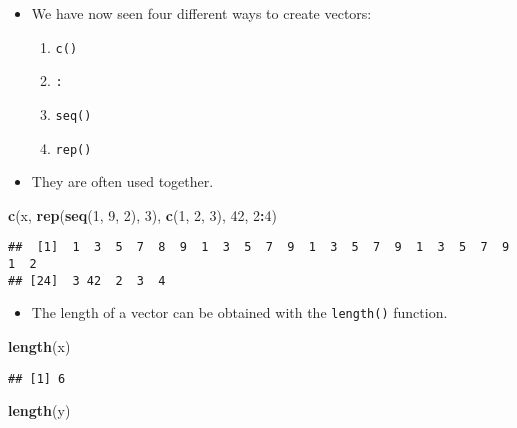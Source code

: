 \documentclass[]{book}
\newenvironment{Shaded}{\begin{snugshade}}{\end{snugshade}}
\newcommand{\DecValTok}[1]{\textcolor[rgb]{0.00,0.00,0.81}{#1}}
\newcommand{\KeywordTok}[1]{\textcolor[rgb]{0.13,0.29,0.53}{\textbf{#1}}}
\newcommand{\NormalTok}[1]{#1}
\newcommand{\OperatorTok}[1]{\textcolor[rgb]{0.81,0.36,0.00}{\textbf{#1}}}
\providecommand{\tightlist}{%
  \setlength{\itemsep}{0pt}\setlength{\parskip}{0pt}}
\begin{document}
\begin{itemize}
\tightlist
\item
  We have now seen four different ways to create vectors:

  \begin{enumerate}
  \def\labelenumi{\arabic{enumi}.}
  \tightlist
  \item
    \texttt{c()}
  \item
    \texttt{:}
  \item
    \texttt{seq()}
  \item
    \texttt{rep()}
  \end{enumerate}
\item
  They are often used together.
\end{itemize}

\begin{Shaded}
\begin{Highlighting}[]
\KeywordTok{c}\NormalTok{(x, }\KeywordTok{rep}\NormalTok{(}\KeywordTok{seq}\NormalTok{(}\DecValTok{1}\NormalTok{, }\DecValTok{9}\NormalTok{, }\DecValTok{2}\NormalTok{), }\DecValTok{3}\NormalTok{), }\KeywordTok{c}\NormalTok{(}\DecValTok{1}\NormalTok{, }\DecValTok{2}\NormalTok{, }\DecValTok{3}\NormalTok{), }\DecValTok{42}\NormalTok{, }\DecValTok{2}\OperatorTok{:}\DecValTok{4}\NormalTok{)}
\end{Highlighting}
\end{Shaded}

\begin{verbatim}
##  [1]  1  3  5  7  8  9  1  3  5  7  9  1  3  5  7  9  1  3  5  7  9  1  2
## [24]  3 42  2  3  4
\end{verbatim}

\begin{itemize}
\tightlist
\item
  The length of a vector can be obtained with the \texttt{length()} function.
\end{itemize}

\begin{Shaded}
\begin{Highlighting}[]
\KeywordTok{length}\NormalTok{(x)}
\end{Highlighting}
\end{Shaded}

\begin{verbatim}
## [1] 6
\end{verbatim}

\begin{Shaded}
\begin{Highlighting}[]
\KeywordTok{length}\NormalTok{(y)}
\end{Highlighting}
\end{Shaded}
\end{document}
